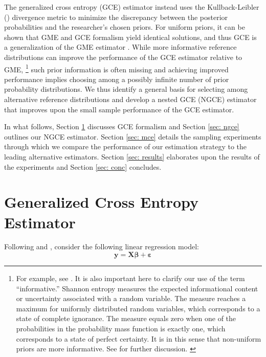 \documentclass[english]{article}
\begin{document}
The generalized cross entropy (GCE) estimator instead uses the 
Kullback-Leibler (\citeyear{kullback1951}) divergence metric to minimize the 
discrepancy between the posterior probabilities and the researcher's chosen 
priors.
For uniform priors, it can be shown that GME and GCE formalism yield
identical solutions, and thus GCE is a generalization of the GME estimator
\citep{golan1996}.
While more informative reference distributions can improve the performance 
of the GCE estimator relative to GME,%
\footnote{For example, see \citet{heckelei2003}. 
It is also important here to clarify our use of the term ``informative.''
Shannon entropy measures the expected informational content or 
uncertainty associated with a random variable.
The measure reaches a maximum for uniformly distributed random 
variables, which corresponds to a state of complete ignorance.
The measure equals zero when one of the probabilities in the probability 
mass function is exactly one, which corresponds to a state of perfect 
certainty.
It is in this sense that non-uniform priors are more informative.
See \citet{golan2008} for further discussion. \label{fn: info}}
such prior information is often missing and achieving improved performance 
implies choosing among a possibly infinite number of prior probability 
distributions.
We thus identify a general basis for selecting among alternative reference 
distributions and develop a nested GCE (NGCE) estimator that improves 
upon the small sample performance of the GCE estimator. 

In what follows, Section \ref{sec: gce} discusses GCE formalism and 
Section \ref{sec: ngce} outlines our NGCE estimator.
Section \ref{sec: mce} details the sampling experiments through which we
compare the performance of our estimation strategy to the leading 
alternative estimators.
Section \ref{sec: results} elaborates upon the results of the 
experiments and Section \ref{sec: conc} concludes. 


\section{Generalized Cross Entropy Estimator}
\label{sec: gce}

Following \cite{golan1996} and \citet{golan2008}, consider the following 
linear regression model: 
\begin{equation}
\mathbf{y} = \mathbf{X\beta} + \mathbf{\varepsilon}
\end{equation}
\end{document}
